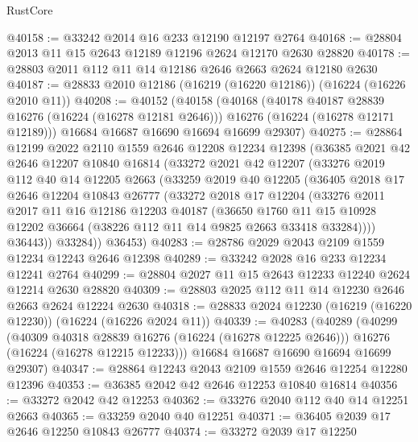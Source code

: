 \begin{lexlean}{RustCore}
\begin{coremodule}
@40158 := @33242 @2014 @16 @233 @12190 @12197 @2764
@40168 := @28804 @2013 @11 @15 @2643 @12189 @12196 @2624 @12170 @2630 @28820
@40178 := @28803 @2011 @112 @11 @14 @12186 @2646 @2663 @2624 @12180 @2630
@40187 := @28833 @2010 @12186 (@16219 (@16220 @12186)) (@16224 (@16226 @2010 @11))
@40208 := @40152
    (@40158
      (@40168
        (@40178 @40187 @28839 @16276 (@16224 (@16278 @12181 @2646)))
        @16276
        (@16224 (@16278 @12171 @12189)))
      @16684
      @16687
      @16690
      @16694
      @16699
      @29307)
@40275 := @28864
    @12199
    @2022
    @2110
    @1559
    @2646
    @12208
    @12234
    @12398
    (@36385
      @2021
      @42
      @2646
      @12207
      @10840
      @16814
      (@33272
        @2021
        @42
        @12207
        (@33276
          @2019
          @112
          @40
          @14
          @12205
          @2663
          (@33259
            @2019
            @40
            @12205
            (@36405
              @2018
              @17
              @2646
              @12204
              @10843
              @26777
              (@33272
                @2018
                @17
                @12204
                (@33276
                  @2011
                  @2017
                  @11
                  @16
                  @12186
                  @12203
                  @40187
                  (@36650
                    @1760
                    @11
                    @15
                    @10928
                    @12202
                    @36664
                    (@38226 @112 @11 @14 @9825 @2663 @33418 @33284))))
              @36443))
          @33284))
      @36453)
@40283 := @28786 @2029 @2043 @2109 @1559 @12234 @12243 @2646 @12398
@40289 := @33242 @2028 @16 @233 @12234 @12241 @2764
@40299 := @28804 @2027 @11 @15 @2643 @12233 @12240 @2624 @12214 @2630 @28820
@40309 := @28803 @2025 @112 @11 @14 @12230 @2646 @2663 @2624 @12224 @2630
@40318 := @28833 @2024 @12230 (@16219 (@16220 @12230)) (@16224 (@16226 @2024 @11))
@40339 := @40283
    (@40289
      (@40299
        (@40309 @40318 @28839 @16276 (@16224 (@16278 @12225 @2646)))
        @16276
        (@16224 (@16278 @12215 @12233)))
      @16684
      @16687
      @16690
      @16694
      @16699
      @29307)
@40347 := @28864 @12243 @2043 @2109 @1559 @2646 @12254 @12280 @12396
@40353 := @36385 @2042 @42 @2646 @12253 @10840 @16814
@40356 := @33272 @2042 @42 @12253
@40362 := @33276 @2040 @112 @40 @14 @12251 @2663
@40365 := @33259 @2040 @40 @12251
@40371 := @36405 @2039 @17 @2646 @12250 @10843 @26777
@40374 := @33272 @2039 @17 @12250

\end{coremodule}
\end{lexlean}
